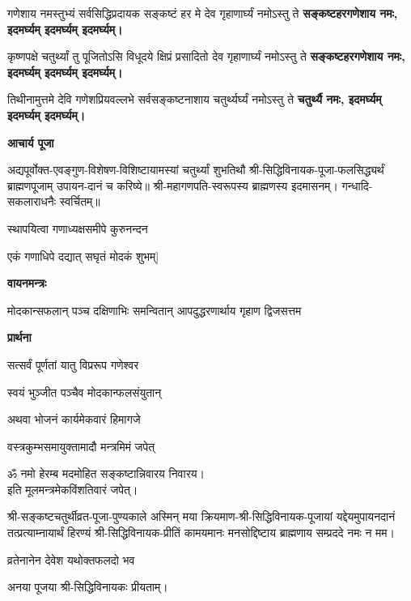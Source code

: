 \begin{center}
\twolineshloka
{गणेशाय नमस्तुभ्यं सर्वसिद्धिप्रदायक}
{सङ्कष्टं हर मे देव गृहाणार्घ्यं नमोऽस्तु ते}
\textbf{सङ्कष्टहरगणेशाय नमः, इदमर्घ्यम् इदमर्घ्यम् इदमर्घ्यम्।}

\twolineshloka
{कृष्णपक्षे चतुर्थ्यां तु पूजितोऽसि विधूदये}
{क्षिप्रं प्रसादितो देव गृहाणार्घ्यं नमोऽस्तु ते}
\textbf{सङ्कष्टहरगणेशाय नमः, इदमर्घ्यम् इदमर्घ्यम् इदमर्घ्यम्।}

\twolineshloka
{तिथीनामुत्तमे देवि गणेशप्रियवल्लभे}
{सर्वसङ्कष्टनाशाय चतुर्थ्यर्घ्यं नमोऽस्तु ते}
\textbf{चतुर्थ्यै नमः, इदमर्घ्यम् इदमर्घ्यम् इदमर्घ्यम्।}

\centerline{\textbf{आचार्य पूजा}}

अद्यपूर्वोक्त-एवङ्गुण-विशेषण-विशिष्टायामस्यां चतुर्थ्यां शुभतिथौ श्री-सिद्धिविनायक-पूजा-फलसिद्ध्यर्थं ब्राह्मणपूजाम् उपायन-दानं च करिष्ये॥
श्री-महागणपति-स्वरूपस्य ब्राह्मणस्य इदमासनम्। गन्धादि-सकलाराधनैः स्वर्चितम्॥

\twolineshloka*
{[अथैकविंशतिं गृह्य मोदकान् घृतपाचितान्}
{स्थापयित्वा गणाध्यक्षसमीपे कुरुनन्दन}

{एकं गणाधिपे दद्यात् सघृतं मोदकं शुभम्]}

\centerline{\textbf{वायनमन्त्रः}}

{मोदकान्सफलान् पञ्च दक्षिणाभिः समन्वितान्}
{आपदुद्धरणार्थाय गृहाण द्विजसत्तम}

\centerline{\textbf{प्रार्थना}}

{सत्सर्वं पूर्णतां यातु विप्ररूप गणेश्वर}

{स्वयं भुञ्जीत पञ्चैव मोदकान्फलसंयुतान्}

{अथवा भोजनं कार्यमेकवारं हिमागजे}

{वस्त्रकुम्भसमायुक्तामादौ मन्त्रमिमं जपेत्}

ॐ नमो हेरम्ब मदमोहित सङ्कष्टान्निवारय निवारय।\\
इति मूलमन्त्रमेकविंशतिवारं जपेत्।
\medskip


\hiranyagarbha

श्री-सङ्कष्टचतुर्थीव्रत-पूजा-पुण्यकाले अस्मिन् मया क्रियमाण-श्री-सिद्धिविनायक-पूजायां
यद्देयमुपायनदानं तत्प्रत्याम्नायार्थं हिरण्यं श्री-सिद्धिविनायक-प्रीतिं
कामयमानः मनसोद्दिष्टाय ब्राह्मणाय सम्प्रददे नमः न मम।

{व्रतेनानेन देवेश यथोक्तफलदो भव}

अनया पूजया श्री-सिद्धिविनायकः प्रीयताम्।


\end{center}

